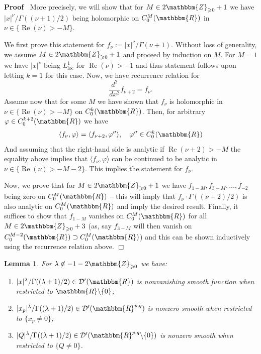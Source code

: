 \documentclass{article}
\newcommand{\assign}{:=}
\newcommand{\nin}{\not\in}
\newcommand{\tmop}[1]{\ensuremath{\operatorname{#1}}}
\newenvironment{proof}{\noindent\textbf{Proof\ }}{\hspace*{\fill}$\Box$\medskip}
\numberwithin{definition}{section}
\newtheorem{lemma}{Lemma}
\numberwithin{lemma}{section}
\numberwithin{proposition}{section}
{\theorembodyfont{\rmfamily}\newtheorem{remark}{Remark}
\numberwithin{remark}{section}
}
\begin{document}
\begin{proof}
  More precisely, we will show that for $M \in 2\mathbbm{Z}_{\geqslant 0} + 1$
  we have $| x |^{\nu} / \Gamma ( ( \nu + 1) / 2)$ being holomorphic on $C^M_0
  ( \mathbbm{R})$ in $\nu \in \{ \tmop{Re} ( \nu) > - M \}$.
  
  We first prove this statement for $f_{\nu} \assign | x |^{\nu} / \Gamma (
  \nu + 1)$. Without loss of generality, we assume $M \in
  2\mathbbm{Z}_{\geqslant 0} + 1$ and proceed by induction on $M$. For $M = 1$
  we have $| x |^{\nu}$ being $L^1_{\tmop{loc}}$ for $\tmop{Re} ( \nu) > - 1$
  and thus statement follows upon letting $k = 1$ for this case. Now, we have
  recurrence relation for
  \[ \frac{d^2}{d x^2} f_{\nu + 2} = f_{\nu} . \]
  Assume now that for some $M$ we have shown that $f_{\nu}$ is holomorphic in
  $\nu \in \{ \tmop{Re} ( \nu) > - M \}$ on $C_0^k ( \mathbbm{R})$. Then, for
  arbitrary $\varphi \in C^{k + 2}_0 ( \mathbbm{R})$ we have
  \[ \langle f_{\nu}, \varphi \rangle = \langle f_{\nu + 2}, \varphi''
     \rangle, \hspace{1em} \varphi'' \in C_0^k ( \mathbbm{R}) \]
  And assuming that the right-hand side is analytic if $\tmop{Re} ( \nu + 2) >
  - M$ the equality above implies that $\langle f_{\nu}, \varphi \rangle$ can
  be continued to be analytic in $\nu \in \{ \tmop{Re} ( \nu) > - M - 2 \}$.
  This implies the statement for $f_{\nu}$.
  
  Now, we prove that for $M \in 2\mathbbm{Z}_{\geqslant 0} + 1$ we have $f_{1
  - M}, f_{3 - M}, \ldots, f_{- 2}$ being zero on $C_0^M ( \mathbbm{R})$ --
  this will imply that $f_{\nu} \cdot \Gamma ( ( \nu + 2) / 2)$ is also
  analytic on $C_0^M ( \mathbbm{R})$ and imply the desired result. Finally, it
  suffices to show that $f_{1 - M}$ vanishes on $C_0^M ( \mathbbm{R})$ for all
  $M \in 2\mathbbm{Z}_{\geqslant 0} + 3$ (as, say $f_{3 - M}$ will then vanish
  on $C_0^{M - 2} ( \mathbbm{R}) \supset C_0^M ( \mathbbm{R})$) and this can
  be shown inductively using the recurrence relation above.
\end{proof}

\begin{lemma}
  \label{supp-n-waves:lem-supp-xp}For $\lambda \nin - 1 -
  2\mathbbm{Z}_{\geqslant 0}$ we have:
  \begin{enumerate}
    \item $| x |^{\lambda} / \Gamma ( ( \lambda + 1) / 2) \in \mathcal{D}' (
    \mathbbm{R})$ is nonvanishing smooth function when restricted to
    $\mathbbm{R}\backslash \{ 0 \}$;
    
    \item $| x_p |^{\lambda} / \Gamma ( ( \lambda + 1) / 2) \in \mathcal{D}' (
    \mathbbm{R}^{p, q})$ is nonzero smooth when restricted to $\{ x_p \neq 0
    \}$;
    
    \item $| Q |^{\lambda} / \Gamma ( ( \lambda + 1) / 2) \in \mathcal{D}' (
    \mathbbm{R}^{p, q} \backslash \{ 0 \})$ is nonzero smooth when restricted
    to $\{ Q \neq 0 \}$.
  \end{enumerate}
\end{lemma}
\end{document}
